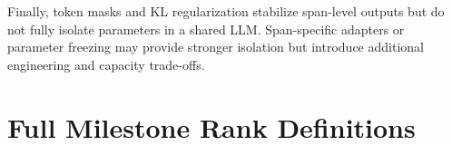 \documentclass{article}
\newcommand{\wei}[1]{\textcolor{red}{#1}}
\begin{document}
Finally, token masks and KL regularization stabilize span-level outputs but do not fully isolate parameters in a shared LLM. Span-specific adapters or parameter freezing may provide stronger isolation but introduce additional engineering and capacity trade-offs.







\appendix %

\section{Full Milestone Rank Definitions}
\end{document}
